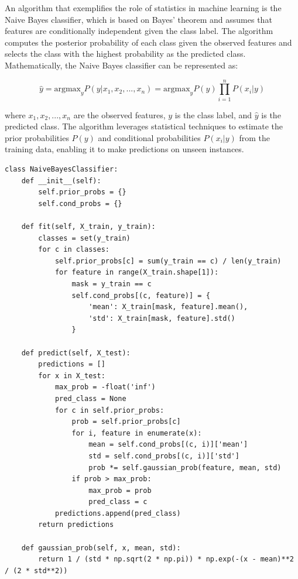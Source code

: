 \documentclass[12pt]{book} %
\begin{document}
An algorithm that exemplifies the role of statistics in machine learning is the Naive Bayes classifier, which is based on Bayes' theorem and assumes that features are conditionally independent given the class label. The algorithm computes the posterior probability of each class given the observed features and selects the class with the highest probability as the predicted class. Mathematically, the Naive Bayes classifier can be represented as:

\[
\hat{y} = \text{argmax}_y P(y | x_1, x_2, ..., x_n) = \text{argmax}_y P(y) \prod_{i=1}^{n} P(x_i | y)
\]

where \(x_1, x_2, ..., x_n\) are the observed features, \(y\) is the class label, and \(\hat{y}\) is the predicted class. The algorithm leverages statistical techniques to estimate the prior probabilities \(P(y)\) and conditional probabilities \(P(x_i | y)\) from the training data, enabling it to make predictions on unseen instances.

\FloatBarrier
\begin{lstlisting}
class NaiveBayesClassifier:
    def __init__(self):
        self.prior_probs = {}
        self.cond_probs = {}
    
    def fit(self, X_train, y_train):
        classes = set(y_train)
        for c in classes:
            self.prior_probs[c] = sum(y_train == c) / len(y_train)
            for feature in range(X_train.shape[1]):
                mask = y_train == c
                self.cond_probs[(c, feature)] = {
                    'mean': X_train[mask, feature].mean(),
                    'std': X_train[mask, feature].std()
                }
    
    def predict(self, X_test):
        predictions = []
        for x in X_test:
            max_prob = -float('inf')
            pred_class = None
            for c in self.prior_probs:
                prob = self.prior_probs[c]
                for i, feature in enumerate(x):
                    mean = self.cond_probs[(c, i)]['mean']
                    std = self.cond_probs[(c, i)]['std']
                    prob *= self.gaussian_prob(feature, mean, std)
                if prob > max_prob:
                    max_prob = prob
                    pred_class = c
            predictions.append(pred_class)
        return predictions
    
    def gaussian_prob(self, x, mean, std):
        return 1 / (std * np.sqrt(2 * np.pi)) * np.exp(-(x - mean)**2 / (2 * std**2))
\end{lstlisting}
\FloatBarrier
\end{document}
